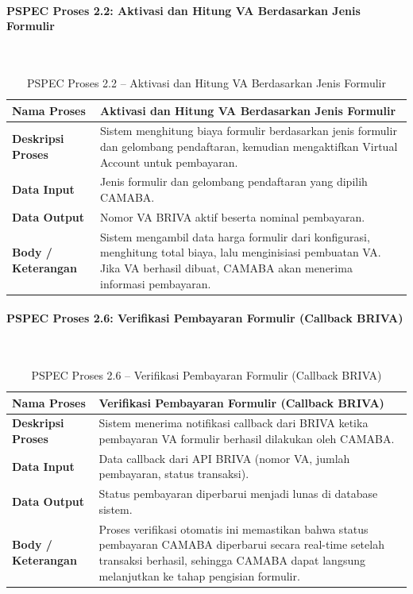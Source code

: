 \paragraph{PSPEC Proses 2.2: Aktivasi dan Hitung VA Berdasarkan Jenis Formulir}~\\
\begin{longtable}{|p{}|p{}|}
	\caption{PSPEC Proses 2.2 -- Aktivasi dan Hitung VA Berdasarkan Jenis Formulir}
	\label{table:3.pspec22}\\
	\hline
	\textbf{Nama Proses} & Aktivasi dan Hitung VA Berdasarkan Jenis Formulir \\
	\hline
	\textbf{Deskripsi Proses} & Sistem menghitung biaya formulir berdasarkan jenis formulir dan gelombang pendaftaran, kemudian mengaktifkan Virtual Account untuk pembayaran. \\
	\hline
	\textbf{Data Input} & Jenis formulir dan gelombang pendaftaran yang dipilih CAMABA. \\
	\hline
	\textbf{Data Output} & Nomor VA BRIVA aktif beserta nominal pembayaran. \\
	\hline
	\textbf{Body / Keterangan} & Sistem mengambil data harga formulir dari konfigurasi, menghitung total biaya, lalu menginisiasi pembuatan VA. Jika VA berhasil dibuat, CAMABA akan menerima informasi pembayaran. \\
	\hline
\end{longtable}

\paragraph{PSPEC Proses 2.6: Verifikasi Pembayaran Formulir (Callback BRIVA)}~\\
\begin{longtable}{|p{}|p{}|}
	\caption{PSPEC Proses 2.6 -- Verifikasi Pembayaran Formulir (Callback BRIVA)}
	\label{table:3.pspec26}\\
	\hline
	\textbf{Nama Proses} & Verifikasi Pembayaran Formulir (Callback BRIVA) \\
	\hline
	\textbf{Deskripsi Proses} & Sistem menerima notifikasi callback dari BRIVA ketika pembayaran VA formulir berhasil dilakukan oleh CAMABA. \\
	\hline
	\textbf{Data Input} & Data callback dari API BRIVA (nomor VA, jumlah pembayaran, status transaksi). \\
	\hline
	\textbf{Data Output} & Status pembayaran diperbarui menjadi lunas di database sistem. \\
	\hline
	\textbf{Body / Keterangan} & Proses verifikasi otomatis ini memastikan bahwa status pembayaran CAMABA diperbarui secara real-time setelah transaksi berhasil, sehingga CAMABA dapat langsung melanjutkan ke tahap pengisian formulir. \\
	\hline
\end{longtable}

